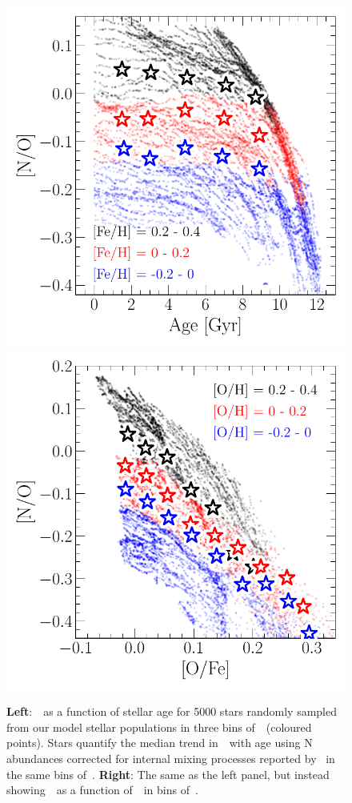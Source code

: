 \documentclass[ms.tex]{subfiles}
\begin{document}
\begin{figure}
\centering
\includegraphics[scale = 0.63]{no_vs_age.pdf}
\includegraphics[scale = 0.64]{no_vs_ofe.pdf}
\caption{
\textbf{Left}:~\no~as a function of stellar age for 5000 stars randomly
sampled from our model stellar populations in three bins of~\feh~(coloured 
points).
Stars quantify the median trend in~\no~with age using N abundances corrected
for internal mixing processes reported by~\citet{Vincenzo2021} in the same
bins of~\feh.
\textbf{Right}: The same as the left panel, but instead showing~\no~as a
function of~\ofe~in bins of~\oh.
}
\label{fig:vincenzo_comp}
\end{figure}
\end{document}
